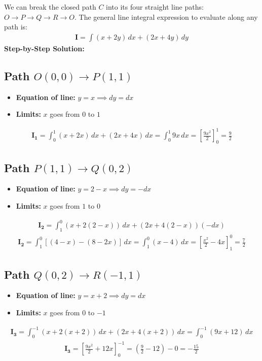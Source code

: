 \documentclass[journal,12pt,onecolumn]{IEEEtran}
\newcommand{\brak}[1]{\left(#1\right)}
\theoremstyle{remark}
\begin{document}
\noindent We can break the closed path $C$ into its four straight line paths: $O \to P \to Q \to R \to O$.
\noindent The general line integral expression to evaluate along any path is:
\begin{align}
\mathbf{I} = \int \brak{x + 2y}\,dx + \brak{2x + 4y}\,dy
\end{align}
\noindent \textbf{Step-by-Step Solution:}
\subsection{Path $O\brak{0,0} \to P\brak{1,1}$}
\begin{itemize}
    \item \textbf{Equation of line:} $y = x \implies dy = dx$
    \item \textbf{Limits:} $x$ goes from $0$ to $1$
\end{itemize}
\begin{align}
\mathbf{I_1} = \int_0^1 \brak{x + 2x}\,dx + \brak{2x + 4x}\,dx = \int_0^1 9x\,dx = \left[ \frac{9x^2}{2} \right]_0^1 = \frac{9}{2}
\end{align}

\subsection{Path $P\brak{1,1} \to Q\brak{0,2}$}
\begin{itemize}
    \item \textbf{Equation of line:} $y = 2 - x \implies dy = -dx$
    \item \textbf{Limits:} $x$ goes from $1$ to $0$
\end{itemize}
\begin{align}
\mathbf{I_2} = \int_1^0 \brak{x + 2\brak{2-x}}\,dx + \brak{2x + 4\brak{2-x}}\brak{-dx}
\end{align}
\begin{align}
\mathbf{I_2} = \int_1^0 \left[ \brak{4-x} - \brak{8-2x} \right]\,dx = \int_1^0 \brak{x-4}\,dx = \left[ \frac{x^2}{2} - 4x \right]_1^0 = \frac{7}{2}
\end{align}

\subsection{Path $Q\brak{0,2} \to R\brak{-1,1}$}
\begin{itemize}
    \item \textbf{Equation of line:} $y = x + 2 \implies dy = dx$
    \item \textbf{Limits:} $x$ goes from $0$ to $-1$
\end{itemize}
\begin{align}
\mathbf{I_3} = \int_0^{-1} \brak{x + 2\brak{x+2}}\,dx + \brak{2x + 4\brak{x+2}}\,dx = \int_0^{-1} \brak{9x + 12}\,dx
\end{align}
\begin{align}
\mathbf{I_3} = \left[ \frac{9x^2}{2} + 12x \right]_0^{-1} = \brak{\frac{9}{2} - 12} - 0 = -\frac{15}{2}
\end{align}
\end{document}
